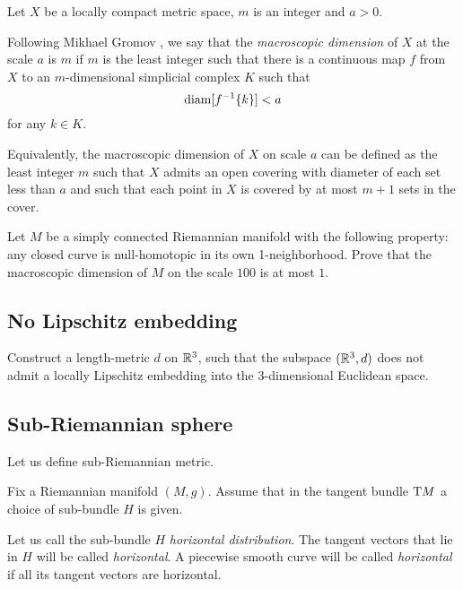 Let $X$ be a locally compact metric space,
$m$ is an integer
and $a>0$.

Following Mikhael Gromov \cite[see][]{gromov:macroscopic-dimension},
we say that the \emph{macroscopic dimension}  of $X$ at the scale $a$ is $m$
if $m$ is the least integer such that there is a continuous map $f$ from $X$ to an $m$-dimensional simplicial complex $K$
such that 
\[\operatorname{\rm diam}\nolimits[f^{-1}\{k\}]<a\]
for any $k\in K$.

Equivalently, the macroscopic dimension of $X$ on scale $a$ can be defined as 
the least integer $m$ such that $X$ admits an open covering with diameter of each set less than $a$ 
and such that each point in $X$ is covered by at most $m+1$ sets in the cover.

\begin{pr}
Let $M$ be a simply connected Riemannian manifold with the following property: 
any closed curve is null-homotopic 
in its own  1-neighborhood. 
Prove that the macroscopic dimension of $M$ on the scale $100$ is at most $1$.
\end{pr}

\subsection*{No Lipschitz embedding\hard}
\label{weird-metric} 

\begin{pr}
Construct a length-metric $d$ on $\mathbb{R}^3$,
such that 
the subspace $(\mathbb{R}^3,d)$ does not admit a locally Lipschitz embedding into the 3-dimensional Euclidean space.
\end{pr}

\subsection*{Sub-Riemannian sphere\thm}
\label{sub-Riemannian} 

Let us define sub-Riemannian metric.

Fix a Riemannian manifold $(M,g)$.
Assume that in the tangent bundle $\mathrm{T} M$ 
a choice of sub-bundle $H$ is given.

Let us call the sub-bundle $H$  \emph{horizontal distribution}.
The tangent vectors that lie in $H$ will be called {}\emph{horizontal}.
A piecewise smooth curve will be called {}\emph{horizontal}
if all its tangent vectors are horizontal.

